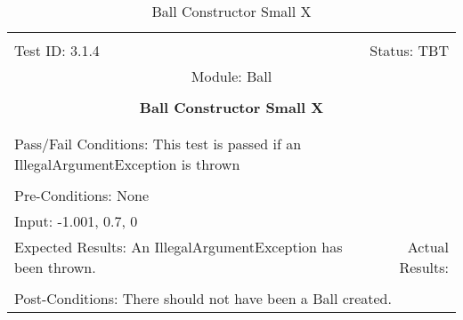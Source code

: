 \documentclass[titlepage]{article}
\begin{document}
\begin{center}%
\begin{table}
\begin{tabular}{|l r|}\hline&\\[-2mm]
	Test ID: 3.1.4	&Status: TBT\\[-3mm]
	\multicolumn{2}{|c|}{Module: Ball}\\&\\
	\multicolumn{2}{|c|}{\textbf{\large{Ball Constructor Small X}}}\\&\\\hline&\\[-3mm]
	\multicolumn{2}{|p{\textwidth}|}{Pass/Fail Conditions: This test is passed if an IllegalArgumentException is thrown}\\[1mm]\hline&\\[-3mm]
	\multicolumn{2}{|p{\textwidth}|}{Pre-Conditions: None}\\[4mm]
	\multicolumn{2}{|p{\textwidth}|}{Input: -1.001, 0.7, 0}\\[2mm]\hline
	\multicolumn{1}{|p{0.49\textwidth}}{Expected Results: An IllegalArgumentException has been thrown.}	&\multicolumn{1}{|p{0.45\textwidth}|}{Actual Results:}\\\hline&\\[-3mm]
	\multicolumn{2}{|p{\textwidth}|}{Post-Conditions: There should not have been a Ball created.}\\\hline
\end{tabular}
\caption{Ball Constructor Small X}
\end{table}
\end{center}
\end{document}
